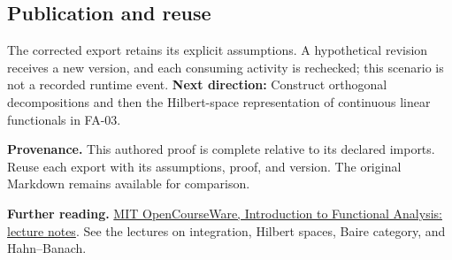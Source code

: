 \documentclass[preprint,12pt,aps,pra,showkeys,amsmath,amssymb,superscriptaddress,floatfix]{revtex4-2}
\theoremstyle{definition}
\theoremstyle{remark}
\begin{document}
\subsection{Publication and reuse}
The corrected export retains its explicit assumptions. A hypothetical
revision receives a new version, and each consuming activity is
rechecked; this scenario is not a recorded runtime event. \textbf{Next
direction:} Construct orthogonal decompositions and then the
Hilbert-space representation of continuous linear functionals in FA-03.

\par\medskip\begingroup\small\linespread{1.0}\selectfont\noindent\textbf{Provenance.} This authored proof is complete relative to its declared imports. Reuse
each export with its assumptions, proof, and version. The original
Markdown remains available for comparison.
\par\endgroup

\par\smallskip\begingroup\small\linespread{1.0}\selectfont\noindent\textbf{Further reading.} \href{https://ocw.mit.edu/courses/18-102-introduction-to-functional-analysis-spring-2021/resources/lecture-notes/}{MIT
OpenCourseWare, Introduction to Functional Analysis: lecture notes}. See
the lectures on integration, Hilbert spaces, Baire category, and
Hahn--Banach.\par\endgroup
\end{document}
